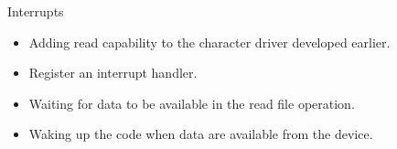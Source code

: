 \setuplabframe
{Interrupts}
{
  \begin{itemize}
  \item Adding read capability to the character driver developed
    earlier.
  \item Register an interrupt handler.
  \item Waiting for data to be available in the read file operation.
  \item Waking up the code when data are available from the device.
  \end{itemize}
}
